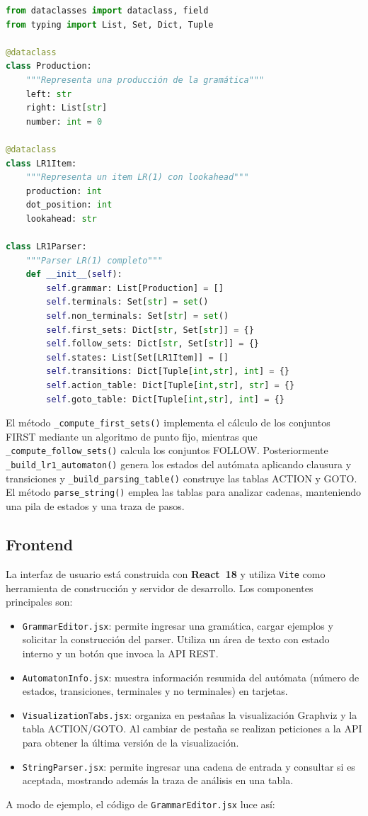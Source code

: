 \documentclass[12pt,a4paper]{article}
\begin{document}
\begin{lstlisting}[style=mypython, language=Python, caption={Definición de clases y atributos principales del parser.}]
from dataclasses import dataclass, field
from typing import List, Set, Dict, Tuple

@dataclass
class Production:
    """Representa una producción de la gramática"""
    left: str
    right: List[str]
    number: int = 0

@dataclass
class LR1Item:
    """Representa un item LR(1) con lookahead"""
    production: int
    dot_position: int
    lookahead: str

class LR1Parser:
    """Parser LR(1) completo"""
    def __init__(self):
        self.grammar: List[Production] = []
        self.terminals: Set[str] = set()
        self.non_terminals: Set[str] = set()
        self.first_sets: Dict[str, Set[str]] = {}
        self.follow_sets: Dict[str, Set[str]] = {}
        self.states: List[Set[LR1Item]] = []
        self.transitions: Dict[Tuple[int,str], int] = {}
        self.action_table: Dict[Tuple[int,str], str] = {}
        self.goto_table: Dict[Tuple[int,str], int] = {}
\end{lstlisting}

El método \texttt{\_compute\_first\_sets()} implementa el cálculo de los conjuntos FIRST mediante un algoritmo de punto fijo, mientras que \texttt{\_compute\_follow\_sets()} calcula los conjuntos FOLLOW.  Posteriormente \texttt{\_build\_lr1\_automaton()} genera los estados del autómata aplicando clausura y transiciones y \texttt{\_build\_parsing\_table()} construye las tablas ACTION y GOTO.  El método \texttt{parse\_string()} emplea las tablas para analizar cadenas, manteniendo una pila de estados y una traza de pasos.

\subsection{Frontend}

La interfaz de usuario está construida con \textbf{React~18} y utiliza \texttt{Vite} como herramienta de construcción y servidor de desarrollo.  Los componentes principales son:
\begin{itemize}
  \item \texttt{GrammarEditor.jsx}: permite ingresar una gramática, cargar ejemplos y solicitar la construcción del parser.  Utiliza un área de texto con estado interno y un botón que invoca la API REST.
  \item \texttt{AutomatonInfo.jsx}: muestra información resumida del autómata (número de estados, transiciones, terminales y no terminales) en tarjetas.
  \item \texttt{VisualizationTabs.jsx}: organiza en pestañas la visualización Graphviz y la tabla ACTION/GOTO.  Al cambiar de pestaña se realizan peticiones a la API para obtener la última versión de la visualización.
  \item \texttt{StringParser.jsx}: permite ingresar una cadena de entrada y consultar si es aceptada, mostrando además la traza de análisis en una tabla.
\end{itemize}
A modo de ejemplo, el código de \verb|GrammarEditor.jsx| luce así:
\end{document}
